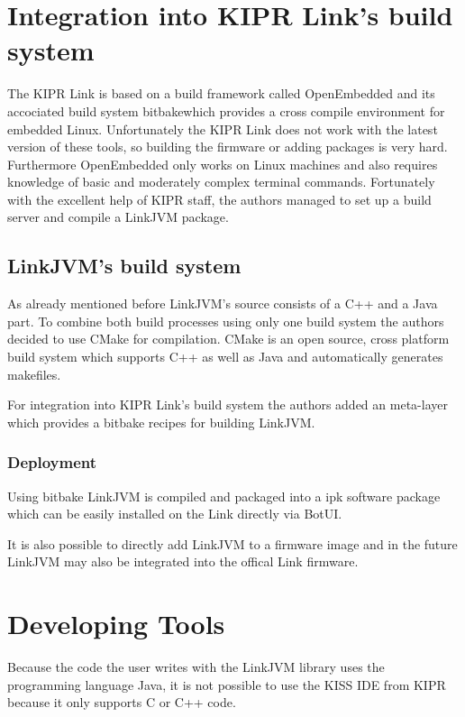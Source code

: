 \documentclass{juniorjournal}
\begin{document}
\section{Integration into KIPR Link's build system}
The KIPR\cite{KIPR} Link\cite{link} is based on a build framework called \frqq OpenEmbedded\flqq\cite{openembedded} and its accociated build system \frqq bitbake\flqq  which provides a cross compile environment for embedded Linux\cite{Look_Inside_Kipr_Link}.
Unfortunately the KIPR\cite{KIPR} Link\cite{link} does not work with the latest version of these tools, so building the firmware or adding packages is very hard.
Furthermore OpenEmbedded\cite{openembedded} only works on Linux machines and also requires knowledge of basic and moderately complex terminal commands.
Fortunately with the excellent help of KIPR staff, the authors managed to set up a build server and compile a LinkJVM package.

\subsection{LinkJVM's build system}
As already mentioned before LinkJVM's source consists of a C++ and a Java\cite{Java} part.
To combine both build processes using only one build system the authors decided to use CMake for compilation.
CMake is an open source, cross platform build system which supports C++ as well as Java\cite{Java} and automatically generates makefiles.

For integration into KIPR\cite{KIPR} Link's\cite{link} build system the authors added an meta-layer which provides a bitbake recipes for building LinkJVM.

\subsubsection{Deployment}
Using bitbake LinkJVM is compiled and packaged into a ipk software package which can be easily installed on the Link\cite{link} directly via BotUI.

It is also possible to directly add LinkJVM to a firmware image and in the future LinkJVM may also be integrated into the offical Link\cite{link} firmware.
\section{Developing Tools}
\label{sec:developing-tools}
Because the code the user writes with the LinkJVM library uses the programming 
language Java\cite{Java}, it is not possible to use the KISS IDE from KIPR\cite{KIPR} because it only 
supports C or C++ code.
\end{document}
